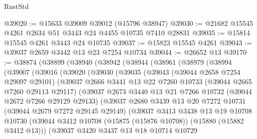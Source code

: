 \begin{lexlean}{RustStd}
\begin{coremodule}
@39020 := @15633 @39009 @39012 (@15796 @38947)
@39030 := @21682 @15545 @4261 @2634 @51 @3443 @24 @4455 @10735 @7410 @28831
@39035 := @15814 @15545 @4261 @3443 @24 @10735
@39037 := @15823 @15545 @4261
@39043 := @39037 @2659 @3442 @13 @23 @7254 @10734
@39044 := @26652 @13
@39170 := @38874
    (@38899
      (@38940
        (@38942
          (@38944
            (@38961
              (@38979
                (@38994
                  (@39007
                    (@39016
                      (@39020
                        (@39030
                          (@39035
                            (@39043
                              (@39044 @2658 @7254 @29097 @29101)
                              (@39037
                                @2666
                                @3441
                                @13
                                @22
                                @7260
                                @10733
                                (@39044 @2665 @7260 @29113 @29117)
                                (@39037
                                  @2673
                                  @3440
                                  @13
                                  @21
                                  @7266
                                  @10732
                                  (@39044 @2672 @7266 @29129 @29133)
                                  (@39037
                                    @2680
                                    @3439
                                    @13
                                    @20
                                    @7272
                                    @10731
                                    (@39044 @2679 @7272 @29145 @29149)
                                    (@39037
                                      @3413
                                      @3438
                                      @13
                                      @19
                                      @10708
                                      @10730
                                      (@39044
                                        @3412
                                        @10708
                                        (@15875 (@15876 @10708))
                                        (@15880 (@15882 @3412 @13)))
                                      (@39037
                                        @3420
                                        @3437
                                        @13
                                        @18
                                        @10714
                                        @10729

\end{coremodule}
\end{lexlean}
